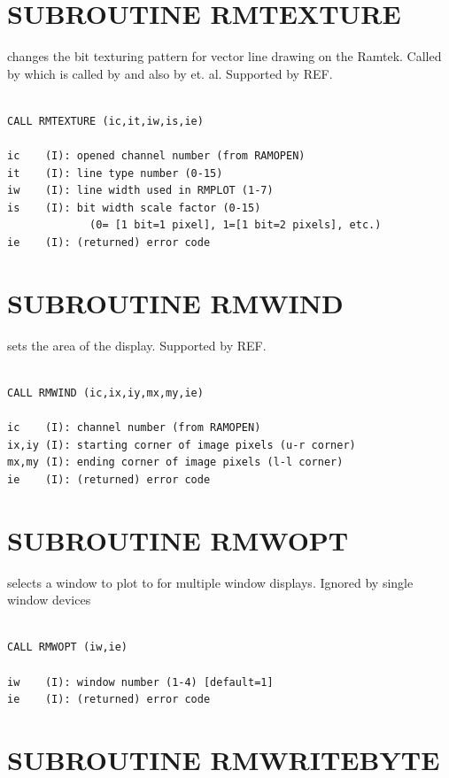 \documentclass[11pt]{report}
\begin{document}
\section{SUBROUTINE RMTEXTURE}

 changes the bit texturing pattern for vector line drawing
on the Ramtek.  Called by  which is called by  and
also by  et. al. Supported by REF.
\begin{verbatim}

CALL RMTEXTURE (ic,it,iw,is,ie)

ic    (I): opened channel number (from RAMOPEN)
it    (I): line type number (0-15)
iw    (I): line width used in RMPLOT (1-7)
is    (I): bit width scale factor (0-15)
             (0= [1 bit=1 pixel], 1=[1 bit=2 pixels], etc.)
ie    (I): (returned) error code
\end{verbatim}

\section{SUBROUTINE RMWIND}

 sets the  area of the  display.  Supported by REF.
\begin{verbatim}

CALL RMWIND (ic,ix,iy,mx,my,ie)

ic    (I): channel number (from RAMOPEN)
ix,iy (I): starting corner of image pixels (u-r corner)
mx,my (I): ending corner of image pixels (l-l corner)
ie    (I): (returned) error code
\end{verbatim}

\section{SUBROUTINE RMWOPT}

 selects a window to plot to for multiple window 
 displays.  Ignored by single window devices
\begin{verbatim}

CALL RMWOPT (iw,ie)

iw    (I): window number (1-4) [default=1]
ie    (I): (returned) error code
\end{verbatim}

\section{SUBROUTINE RMWRITEBYTE}
\end{document}
